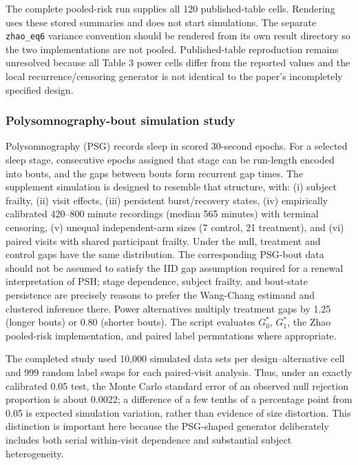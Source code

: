 \documentclass[
  12pt]{article}
\begin{document}
The complete pooled-risk run supplies all 120 published-table cells.
Rendering uses these stored summaries and does not start simulations.
The separate \texttt{zhao\_eq6} variance convention should be rendered
from its own result directory so the two implementations are not pooled.
Published-table reproduction remains unresolved because all Table 3
power cells differ from the reported values and the local
recurrence/censoring generator is not identical to the paper's
incompletely specified design.

\subsubsection{Polysomnography-bout simulation
study}\label{polysomnography-bout-simulation-study}

Polysomnography (PSG) records sleep in scored 30-second epochs. For a
selected sleep stage, consecutive epochs assigned that stage can be
run-length encoded into bouts, and the gaps between bouts form recurrent
gap times. The supplement simulation is designed to resemble that
structure, with: (i) subject frailty, (ii) visit effects, (iii)
persistent burst/recovery states, (iv) empirically calibrated 420--800
minute recordings (median 565 minutes) with terminal censoring, (v)
unequal independent-arm sizes (7 control, 21 treatment), and (vi) paired
visits with shared participant frailty. Under the null, treatment and
control gaps have the same distribution. The corresponding PSG-bout data
should not be assumed to satisfy the IID gap assumption required for a
renewal interpretation of PSH; stage dependence, subject frailty, and
bout-state persistence are precisely reasons to prefer the Wang-Chang
estimand and clustered inference there. Power alternatives multiply
treatment gaps by 1.25 (longer bouts) or 0.80 (shorter bouts). The
script evaluates \(G_0^*\), \(G_1^*\), the Zhao pooled-risk
implementation, and paired label permutations where appropriate.

The completed study used 10,000 simulated data sets per
design--alternative cell and 999 random label swaps for each
paired-visit analysis. Thus, under an exactly calibrated 0.05 test, the
Monte Carlo standard error of an observed null rejection proportion is
about 0.0022; a difference of a few tenths of a percentage point from
0.05 is expected simulation variation, rather than evidence of size
distortion. This distinction is important here because the PSG-shaped
generator deliberately includes both serial within-visit dependence and
substantial subject heterogeneity.
\end{document}
